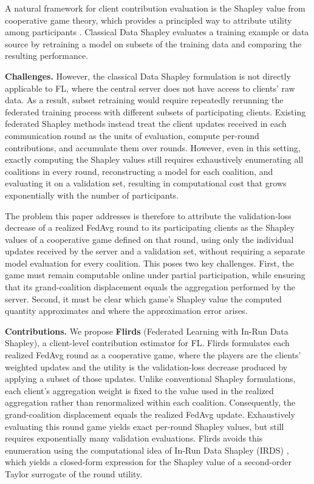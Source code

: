 \documentclass[letterpaper]{article} %
\theoremstyle{definition} %
\begin{document}
A natural framework for client contribution evaluation is the Shapley value from cooperative game theory, which provides a principled way to attribute utility among participants \citep{shapley1953value,ghorbani2019data}. 
Classical Data Shapley evaluates a training example or data source by
retraining a model on subsets of the training data and comparing the resulting
performance. 

\noindent\textbf{Challenges.}
However, the classical Data Shapley formulation is not directly applicable to FL,
where the central server does not have access to clients' raw data. As a result,
subset retraining would require repeatedly rerunning the federated training
process with different subsets of participating clients. Existing federated
Shapley methods instead treat the client updates received in each communication
round as the units of evaluation, compute per-round contributions, and
accumulate them over rounds. However, even in this setting, exactly
computing the Shapley values still requires exhaustively enumerating all coalitions in every
round, reconstructing a model for each coalition, and evaluating it on a
validation set, resulting in computational cost that grows exponentially with
the number of participants.

The problem this paper addresses is therefore to attribute the validation-loss decrease of a realized FedAvg round to its participating clients as the Shapley values of a cooperative game defined on that round, using only the individual updates received by the server and a validation set, without requiring a separate model evaluation for every coalition. This poses two key challenges. First, the game must remain computable online under partial participation, while ensuring that its grand-coalition displacement equals the aggregation performed by the server. Second, it must be clear which game's Shapley value the computed quantity approximates and where the approximation error arises.

\noindent\textbf{Contributions.} We propose \textbf{Flirds} (Federated Learning with In-Run Data Shapley), a
client-level contribution estimator for FL. Flirds formulates
each realized FedAvg round as a cooperative game, where the players are the
clients' weighted updates and the utility is the validation-loss decrease
produced by applying a subset of those updates. Unlike conventional Shapley
formulations, each client's aggregation weight is fixed to the value used in
the realized aggregation rather than renormalized within each coalition.
Consequently, the grand-coalition displacement equals the realized FedAvg 
update. Exhaustively evaluating this round game yields exact
per-round Shapley values, but still requires exponentially many validation
evaluations.  Flirds avoids this enumeration using the computational idea of
In-Run Data Shapley (IRDS) \citep{wang2025data}, which yields a closed-form expression for the
Shapley value of a second-order Taylor surrogate of the round utility.
\end{document}
